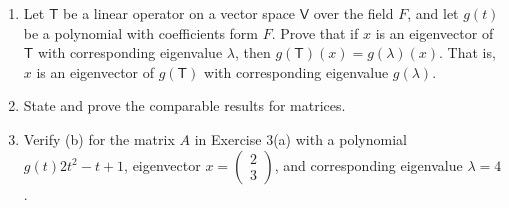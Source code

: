 \begin{enumerate}
\item Let $\mathsf{T}$ be a linear operator on a vector space
  $\mathsf{V}$ over the field $F$, and let $g(t)$ be a polynomial with
  coefficients form $F$. Prove that if $x$ is an eigenvector of
  $\mathsf{T}$ with corresponding eigenvalue $\lambda$, then
  $g(\mathsf{T})(x)= g(\lambda)(x)$. That is, $x$ is an eigenvector of
  $g(\mathsf{T})$ with corresponding eigenvalue $g(\lambda)$.
\item State and prove the comparable results for matrices.
\item Verify (b) for the matrix $A$ in Exercise 3(a) with a
  polynomial $g(t) 2t^2 -t +1$, eigenvector $x
  = \begin{pmatrix}2\\3\end{pmatrix}$, and corresponding eigenvalue
  $\lambda = 4$.
\end{enumerate}

